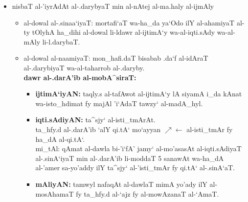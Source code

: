 \begin{itemize}
    \item nisbaT al-'iyrAdAt al-.darybyaT min al-nAtej al-ma.haly al-ijmAly
    \begin{itemize}
        \item al-dowal al-.sinaa`iyaT: mortafi`aT wa-ha_da ya`Odo ilY
            al-ahamiyaT al-ty tOlyhA ha_dihi al-dowal li-ldawr al-ijtimA`y
            wa-al-iqti.sAdy wa-al-mAly li-l.darybaT.
        \item al-dowal al-naamiyaT: mon_hafi.daT bisabab .da`f al-idAraT
            al-.darybiyaT wa-al-taharrob al-.daryby.\\
            \smallskip
            \textbf{dawr al-.darA'ib al-mobA^siraT:}
            \smallskip
            \begin{itemize}
                \item\textbf{ijtimA`iyAN:} taqly.s al-tafAwot al-ijtimA`y lA
                    siyamA i_da kAnat wa-isto_hdimat fy majAl 'i`AdaT tawzy`
                    al-madA_hyl.
                \item\textbf{iqti.sAdiyAN:} ta^sjy` al-isti_tmArAt.\\
                    \smallskip
                    ta_hfy.d al-.darA'ib `alY qi.tA` mo`ayyan
                    $\nearrow\leftarrow$ al-isti_tmAr fy ha_dA al-qi.tA`.\\
                    mi_tAl: qAmat al-dawla bi-'i`fA' jamy` al-mo'asasAt
                    al-iqti.sAdiyaT al-.sinA`iyaT min al-.darA'ib li-moddaT 5
                    sanawAt wa-ha_dA al-'amer sa-yo'addy ilY ta^sjy`
                    al-'isti_tmAr fy qi.tA` al-.sinA`aT.
                \item\textbf{mAliyAN: } tamwyl nafaqAt al-dawlaT mimA yo'ady ilY
                    al-mosAhamaT fy ta_hfy.d al-`ajz fy al-mowAzanaT al-`AmaT.
            \end{itemize}
    \end{itemize}


\end{itemize}
